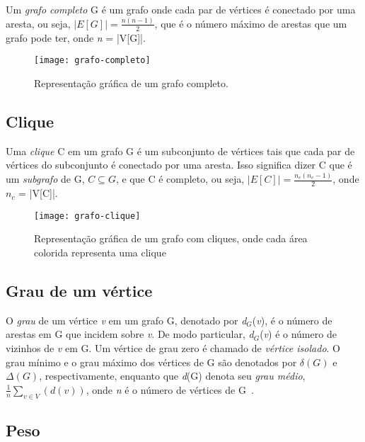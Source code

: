 Um \emph{grafo completo} G é um grafo onde cada par de vértices é conectado por uma aresta, ou seja, $|E[G]| = \frac{n(n-1)}{2}$, que é o número máximo de arestas que um grafo pode ter, onde \emph{n} = |V[G]|.

\begin{figure}[H]
\texttt{[image: grafo-completo]}
\centering
\caption{Representação gráfica de um grafo completo.}
\end{figure}

\subsection{Clique}
\label{conceitos__grafo--clique}

Uma \emph{clique} C em um grafo G é um subconjunto de vértices tais que cada par de vértices do subconjunto é conectado por uma aresta. Isso significa dizer C que é um \emph{subgrafo} de G, $C \subseteq G$, e que C é completo, ou seja, $|E[C]| = \frac{n_{c}(n_{c}-1)}{2}$, onde $n_{c}$ = |V[C]|.

\begin{figure}[H]
\texttt{[image: grafo-clique]}
\centering
\caption{Representação gráfica de um grafo com cliques, onde cada área colorida representa uma clique}
\end{figure}

\subsection{Grau de um vértice}
\label{conceitos__grafo--grau}

\def \variable {\emph{v}}

O \emph{grau} de um vértice \emph{v} em um grafo G, denotado por \emph{d$_{G}$}(\emph{v}), é o número de arestas em G que incidem sobre \emph{v}. De modo particular, \emph{d$_{G}$}(\emph{v}) é o número de vizinhos de \emph{v} em G. Um vértice de grau zero é chamado de \emph{vértice isolado}. O grau mínimo e o grau máximo dos vértices de G são denotados por $\delta(G)$ e $\Delta(G)$, respectivamente, enquanto que \emph{d}(G) denota seu \emph{grau médio}, $\frac{1}{n}\sum_{v\in V}(d(v))$, onde \emph{n} é o número de vértices de G~\cite{bondy1976graph}.

\subsection{Peso}
\label{conceitos__grafo--peso}


